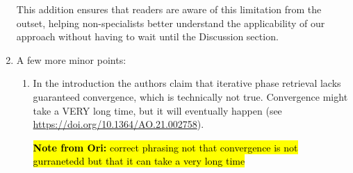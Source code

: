 \documentclass[12pt]{article}
\newcommand{\hlred}[1]{\sethlcolor{red!30}\hl{#1}}
\newcommand{\hlyellow}[1]{\sethlcolor{yellow!50}\hl{#1}}
\newenvironment{reviewercomment}
    {\begin{tcolorbox}[width=\linewidth,colback=gray!5,colframe=commentcolor!50,title=Reviewer Comment,left=5pt,right=5pt]}
    {\end{tcolorbox}}
\newenvironment{ourresponse}
    {\begin{tcolorbox}[width=\linewidth,breakable,enhanced,colback=gray!5,colframe=responsecolor!50,title=Response,left=5pt,right=5pt]}
    {\end{tcolorbox}}
\begin{document}
\begin{enumerate}[label=\arabic*.]
\begin{ourresponse}
        This addition ensures that readers are aware of this limitation from the outset, helping non-specialists better understand the applicability of our approach without having to wait until the Discussion section.
    \end{ourresponse}
    
    \item A few more minor points:
    \begin{enumerate}[label=3.\alph*.]
        \item \leavevmode\vspace{-\baselineskip}
        \begin{reviewercomment}
            In the introduction the authors claim that iterative phase retrieval lacks guaranteed convergence, which is technically not true. Convergence might take a VERY long time, but it will eventually happen (see \url{https://doi.org/10.1364/AO.21.002758}).
        \end{reviewercomment}

           
        \begin{ourresponse}
        \hlyellow{
            \textbf{Note from Ori:}
            correct phrasing not that convergence is not gurranetedd but that it can take a very long time}
        \end{ourresponse}
        

\end{enumerate}
\end{enumerate}
\end{document}
